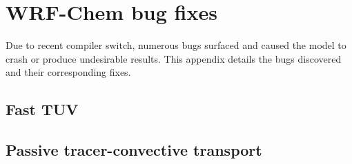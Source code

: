 \chapter{WRF-Chem bug fixes} \label{apdx:bug}

\ifpdf
    \graphicspath{{Appendix/figures/PNG/}{Appendix/figures/PDF/}{Appendix/figures/}}
\else
    \graphicspath{{Appendix/figures/EPS/}{Appendix/figures/}}
\fi

Due to recent compiler switch, numerous bugs surfaced and caused the model to crash or produce undesirable results. This appendix details the bugs discovered and their corresponding fixes.

\section{Fast TUV}\label{a-sec:bug/ftuv}



\section{Passive tracer-convective transport}\label{a-sec:bug/tracer}